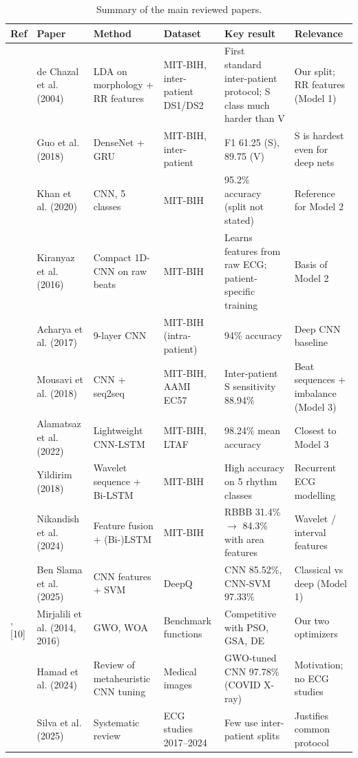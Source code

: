 \documentclass[11pt,a4paper]{article}
\begin{document}
\begin{table}[H]
\centering
\footnotesize
\caption{Summary of the main reviewed papers.}
\label{tab:lit}
\begin{tabular}{p{0.7cm}p{2.4cm}p{3.0cm}p{2.3cm}p{3.6cm}p{2.9cm}}
\toprule
\textbf{Ref} & \textbf{Paper} & \textbf{Method} & \textbf{Dataset} & \textbf{Key result} & \textbf{Relevance} \\
\midrule
[12] & de Chazal et al. (2004) & LDA on morphology + RR features & MIT-BIH, inter-patient DS1/DS2 & First standard inter-patient protocol; S class much harder than V & Our split; RR features (Model 1) \\
[4] & Guo et al. (2018) & DenseNet + GRU & MIT-BIH, inter-patient & F1 61.25 (S), 89.75 (V) & S is hardest even for deep nets \\
[3] & Khan et al. (2020) & CNN, 5 classes & MIT-BIH & 95.2\% accuracy (split not stated) & Reference for Model 2 \\
[13] & Kiranyaz et al. (2016) & Compact 1D-CNN on raw beats & MIT-BIH & Learns features from raw ECG; patient-specific training & Basis of Model 2 \\
[14] & Acharya et al. (2017) & 9-layer CNN & MIT-BIH (intra-patient) & 94\% accuracy & Deep CNN baseline \\
[21] & Mousavi et al. (2018) & CNN + seq2seq & MIT-BIH, AAMI EC57 & Inter-patient S sensitivity 88.94\% & Beat sequences + imbalance (Model 3) \\
[5] & Alamatsaz et al. (2022) & Lightweight CNN-LSTM & MIT-BIH, LTAF & 98.24\% mean accuracy & Closest to Model 3 \\
[7] & Yildirim (2018) & Wavelet sequence + Bi-LSTM & MIT-BIH & High accuracy on 5 rhythm classes & Recurrent ECG modelling \\
[6] & Nikandish et al. (2024) & Feature fusion + (Bi-)LSTM & MIT-BIH & RBBB 31.4\% $\rightarrow$ 84.3\% with area features & Wavelet / interval features \\
[8] & Ben Slama et al. (2025) & CNN features + SVM & DeepQ & CNN 85.52\%, CNN-SVM 97.33\% & Classical vs deep (Model 1) \\
[9], [10] & Mirjalili et al. (2014, 2016) & GWO, WOA & Benchmark functions & Competitive with PSO, GSA, DE & Our two optimizers \\
[11] & Hamad et al. (2024) & Review of metaheuristic CNN tuning & Medical images & GWO-tuned CNN 97.78\% (COVID X-ray) & Motivation; no ECG studies \\
[16] & Silva et al. (2025) & Systematic review & ECG studies 2017--2024 & Few use inter-patient splits & Justifies common protocol \\
\bottomrule
\end{tabular}
\end{table}
\end{document}
